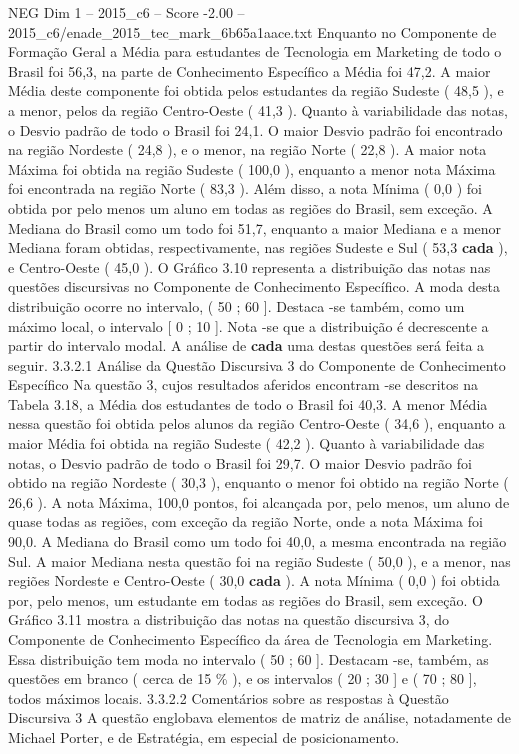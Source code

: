 \begin{textsample}{NEG Dim 1 – 2015\_c6 – Score -2.00 – 2015\_c6/enade\_2015\_tec\_mark\_6b65a1aace.txt}
Enquanto no Componente de Formação Geral a Média para estudantes de Tecnologia em Marketing de todo o Brasil foi 56,3, na parte de Conhecimento Específico a Média foi 47,2.
A maior Média deste componente foi obtida pelos estudantes da região Sudeste ( 48,5 ), e a menor, pelos da região Centro-Oeste ( 41,3 ).
Quanto à variabilidade das notas, o Desvio padrão de todo o Brasil foi 24,1.
O maior Desvio padrão foi encontrado na região Nordeste ( 24,8 ), e o menor, na região Norte ( 22,8 ).
A maior nota Máxima foi obtida na região Sudeste ( 100,0 ), enquanto a menor nota Máxima foi encontrada na região Norte ( 83,3 ).
Além disso, a nota Mínima ( 0,0 ) foi obtida por pelo menos um aluno em todas as regiões do Brasil, sem exceção.
A Mediana do Brasil como um todo foi 51,7, enquanto a maior Mediana e a menor Mediana foram obtidas, respectivamente, nas regiões Sudeste e Sul ( 53,3 \textbf{cada} ), e Centro-Oeste ( 45,0 ).
O Gráfico 3.10 representa a distribuição das notas nas questões discursivas no Componente de Conhecimento Específico.
A moda desta distribuição ocorre no intervalo, ( 50 ; 60 ].
Destaca -se também, como um máximo local, o intervalo [ 0 ; 10 ].
Nota -se que a distribuição é decrescente a partir do intervalo modal.
A análise de \textbf{cada} uma destas questões será feita a seguir. 3.3.2.1 Análise da Questão Discursiva 3 do Componente de Conhecimento Específico Na questão 3, cujos resultados aferidos encontram -se descritos na Tabela 3.18, a Média dos estudantes de todo o Brasil foi 40,3.
A menor Média nessa questão foi obtida pelos alunos da região Centro-Oeste ( 34,6 ), enquanto a maior Média foi obtida na região Sudeste ( 42,2 ).
Quanto à variabilidade das notas, o Desvio padrão de todo o Brasil foi 29,7.
O maior Desvio padrão foi obtido na região Nordeste ( 30,3 ), enquanto o menor foi obtido na região Norte ( 26,6 ).
A nota Máxima, 100,0 pontos, foi alcançada por, pelo menos, um aluno de quase todas as regiões, com exceção da região Norte, onde a nota Máxima foi 90,0.
A Mediana do Brasil como um todo foi 40,0, a mesma encontrada na região Sul.
A maior Mediana nesta questão foi na região Sudeste ( 50,0 ), e a menor, nas regiões Nordeste e Centro-Oeste ( 30,0 \textbf{cada} ).
A nota Mínima ( 0,0 ) foi obtida por, pelo menos, um estudante em todas as regiões do Brasil, sem exceção.
O Gráfico 3.11 mostra a distribuição das notas na questão discursiva 3, do Componente de Conhecimento Específico da área de Tecnologia em Marketing.
Essa distribuição tem moda no intervalo ( 50 ; 60 ].
Destacam -se, também, as questões em branco ( cerca de 15 \% ), e os intervalos ( 20 ; 30 ] e ( 70 ; 80 ], todos máximos locais. 3.3.2.2 Comentários sobre as respostas à Questão Discursiva 3 A questão englobava elementos de matriz de análise, notadamente de Michael Porter, e de Estratégia, em especial de posicionamento.

\end{textsample}
